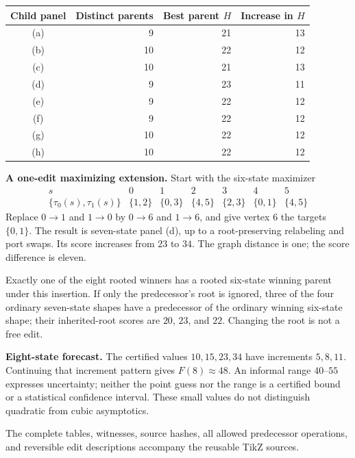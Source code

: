 \documentclass[10pt,a4paper]{article}
\begin{document}
\begin{center}\begin{tabular}{crrr}
\toprule Child panel & Distinct parents & Best parent $H$ & Increase in $H$ \\ \midrule
(a) & 9 & 21 & 13 \\
(b) & 10 & 22 & 12 \\
(c) & 10 & 21 & 13 \\
(d) & 9 & 23 & 11 \\
(e) & 9 & 22 & 12 \\
(f) & 9 & 22 & 12 \\
(g) & 10 & 22 & 12 \\
(h) & 10 & 22 & 12 \\
\bottomrule\end{tabular}\end{center}\vspace{4mm}
\textbf{A one-edit maximizing extension.} Start with the six-state maximizer\[\begin{array}{c|rrrrrr}s&0&1&2&3&4&5\\\hline\{\tau_0(s),\tau_1(s)\}&\{1,2\}&\{0,3\}&\{4,5\}&\{2,3\}&\{0,1\}&\{4,5\}\end{array}\]Replace $0\to1$ and $1\to0$ by $0\to6$ and $1\to6$, and give vertex $6$ the targets $\{0,1\}$. The result is seven-state panel (d), up to a root-preserving relabeling and port swaps. Its score increases from $23$ to $34$. The graph distance is one; the score difference is eleven.\par\vspace{3mm}
Exactly one of the eight rooted winners has a rooted six-state winning parent under this insertion. If only the predecessor's root is ignored, three of the four ordinary seven-state shapes have a predecessor of the ordinary winning six-state shape; their inherited-root scores are $20$, $23$, and $22$. Changing the root is not a free edit.\par\vspace{4mm}
\textbf{Eight-state forecast.} The certified values $10,15,23,34$ have increments $5,8,11$. Continuing that increment pattern gives $F(8)\approx48$. An informal range $40$--$55$ expresses uncertainty; neither the point guess nor the range is a certified bound or a statistical confidence interval. These small values do not distinguish quadratic from cubic asymptotics.\par\vspace{3mm}
The complete tables, witnesses, source hashes, all allowed predecessor operations, and reversible edit descriptions accompany the reusable TikZ sources.\par
\end{document}
